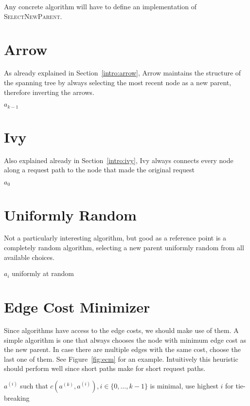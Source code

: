 \documentclass[a4paper, oneside]{discothesis}
\begin{document}
Any concrete algorithm will have to define an implementation of \textsc{SelectNewParent}.

\section{Arrow}

As already explained in Section~\ref{intro:arrow}, Arrow maintains the structure of the spanning tree by always selecting the most recent node as a new parent, therefore inverting the arrows.
\begin{algorithmic}
\State\Return $a_{k-1}$
\EndFunction
\end{algorithmic}

\section{Ivy}

Also explained already in Section~\ref{intro:ivy}, Ivy always connects every node along a request path to the node that made the original request
\begin{algorithmic}
\State\Return $a_0$
\EndFunction
\end{algorithmic}


\section{Uniformly Random}

Not a particularly interesting algorithm, but good as a reference point is a completely random algorithm, selecting a new parent uniformly random from all available choices.

\begin{algorithmic}
\State\Return $a_i$ uniformly at random
\EndFunction
\end{algorithmic}

\section{Edge Cost Minimizer}

Since algorithms have access to the edge costs, we should make use of them. A simple algorithm is one that always chooses the node with minimum edge cost as the new parent. In case there are multiple edges with the same cost, choose the last one of them. See Figure~\ref{fig:ecm} for an example. Intuitively this heuristic should perform well since short paths make for short request paths.
\begin{algorithmic}
\State\Return$a^{(i)}$ such that $c(a^{(k)},a^{(i)}),i\in\{0,\dots,k-1\}$ is minimal, use highest $i$ for tie-breaking
\EndFunction
\end{algorithmic}
\end{document}
